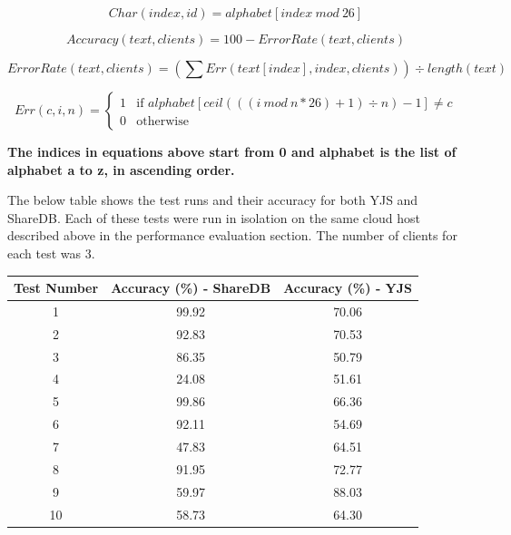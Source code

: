 \documentclass[9pt, titlepage]{article}
\begin{document}
  \begin{equation} \label{simple_insertion_algorithm_character}
    Char(index, id) = alphabet[index\ mod\ 26]
  \end{equation}

  \begin{equation} \label{overall_accuracy_measure}
    Accuracy(text, clients) = 100 - ErrorRate(text, clients)
  \end{equation}

  \begin{equation} \label{overall_accuracy_measure}
    ErrorRate(text, clients) = (\sum Err(text[index], index, clients)) \div length(text)
  \end{equation}

  \begin{equation} \label{error_calculation}
    Err(c, i, n) = 
    \left\{
	    \begin{array}{ll}
        1 & \mbox{if } alphabet[ceil(((i\ mod\ n * 26) + 1) \div n)-1] \neq c \\
        0 & \mbox{otherwise }
	    \end{array}
    \right.
  \end{equation}

  \textbf{The indices in equations above start from 0 and alphabet is the list of alphabet a to z, in ascending order.}
  
  The below table shows the test runs and their accuracy for both YJS and ShareDB. Each of these tests were run in isolation on
  the same cloud host described above in the performance evaluation section. The number of clients for each test was 3.\\

  \begin{center}
    \begin{tabular}{||c c c||} 
      \hline
      Test Number & Accuracy (\%) - ShareDB & Accuracy (\%) - YJS \\ [0.5ex] 
      \hline\hline
      1 & 99.92 & 70.06 \\ 
      \hline
      2 & 92.83 & 70.53 \\
      \hline
      3 & 86.35 & 50.79 \\
      \hline
      4 & 24.08 & 51.61 \\
      \hline
      5 & 99.86 & 66.36 \\
      \hline
      6 & 92.11 & 54.69 \\
      \hline
      7 & 47.83 & 64.51 \\
      \hline
      8 & 91.95 & 72.77 \\
      \hline
      9 & 59.97 & 88.03 \\
      \hline
      10 & 58.73 & 64.30 \\
      \hline
    \end{tabular}
  \end{center}
  
\end{document}
